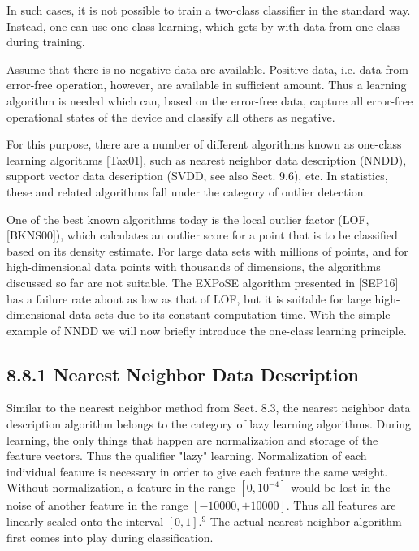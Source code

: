 \documentclass[10pt]{book}
\begin{document}
\begin{center}
\begin{enumerate}
\begin{center}
\begin{center}
\begin{center}
In such cases, it is not possible to train a two-class classifier in the standard way. Instead, one can use one-class learning, which gets by with data from one class during training.

Assume that there is no negative data are available. Positive data, i.e. data from error-free operation, however, are available in sufficient amount. Thus a learning algorithm is needed which can, based on the error-free data, capture all error-free operational states of the device and classify all others as negative.

For this purpose, there are a number of different algorithms known as one-class learning algorithms [Tax01], such as nearest neighbor data description (NNDD), support vector data description (SVDD, see also Sect. 9.6), etc. In statistics, these and related algorithms fall under the category of outlier detection.

One of the best known algorithms today is the local outlier factor (LOF, [BKNS00]), which calculates an outlier score for a point that is to be classified based on its density estimate. For large data sets with millions of points, and for high-dimensional data points with thousands of dimensions, the algorithms discussed so far are not suitable. The EXPoSE algorithm presented in [SEP16] has a failure rate about as low as that of LOF, but it is suitable for large high-dimensional data sets due to its constant computation time. With the simple example of NNDD we will now briefly introduce the one-class learning principle.

\subsection*{8.8.1 Nearest Neighbor Data Description}
Similar to the nearest neighbor method from Sect. 8.3, the nearest neighbor data description algorithm belongs to the category of lazy learning algorithms. During learning, the only things that happen are normalization and storage of the feature vectors. Thus the qualifier "lazy" learning. Normalization of each individual feature is necessary in order to give each feature the same weight. Without normalization, a feature in the range $\left[0,10^{-4}\right]$ would be lost in the noise of another feature in the range $[-10000,+10000]$. Thus all features are linearly scaled onto the interval $[0,1] .^{9}$ The actual nearest neighbor algorithm first comes into play during classification.


\end{center}
\end{center}
\end{center}
\end{enumerate}
\end{center}
\end{document}
